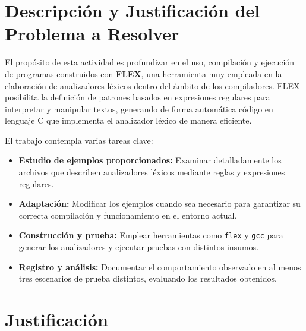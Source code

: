 \documentclass{article}
\begin{document}

\section{Descripción y Justificación del Problema a Resolver}\label{sec:descr}

El propósito de esta actividad es profundizar en el uso, compilación y ejecución de programas construidos con \textbf{FLEX}, una herramienta muy empleada en la elaboración de analizadores léxicos dentro del ámbito de los compiladores. FLEX posibilita la definición de patrones basados en expresiones regulares para interpretar y manipular textos, generando de forma automática código en lenguaje C que implementa el analizador léxico de manera eficiente.

El trabajo contempla varias tareas clave:
\begin{itemize}
    \item \textbf{Estudio de ejemplos proporcionados:} Examinar detalladamente los archivos que describen analizadores léxicos mediante reglas y expresiones regulares.
    \item \textbf{Adaptación:} Modificar los ejemplos cuando sea necesario para garantizar su correcta compilación y funcionamiento en el entorno actual.
    \item \textbf{Construcción y prueba:} Emplear herramientas como \texttt{flex} y \texttt{gcc} para generar los analizadores y ejecutar pruebas con distintos insumos.
    \item \textbf{Registro y análisis:} Documentar el comportamiento observado en al menos tres escenarios de prueba distintos, evaluando los resultados obtenidos.
\end{itemize}

\section*{Justificación}
\end{document}
